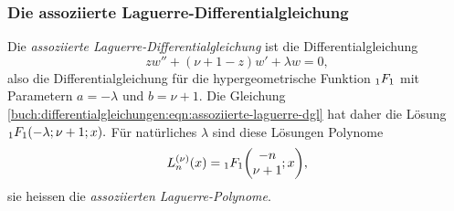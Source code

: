\subsubsection{Die assoziierte Laguerre-Differentialgleichung}
%
%
%
Die {\em assoziierte Laguerre-Differentialgleichung} ist die
Differentialgleichung
\begin{equation}
zw'' + (\nu  +1-z)w' + \lambda w = 0,
\label{buch:differentialgleichungen:eqn:assoziierte-laguerre-dgl}
\end{equation}
also die Differentialgleichung für die hypergeometrische Funktion
$\mathstrut_1F_1$ mit Parametern $a=-\lambda$ und $b=\nu+1$.
Die Gleichung
\eqref{buch:differentialgleichungen:eqn:assoziierte-laguerre-dgl}
hat daher die Lösung
\(
\mathstrut_1F_1(-\lambda;\nu+1;x).
\)
Für natürliches $\lambda$ sind diese Lösungen Polynome
\[
L_n^{(\nu)}(x)
=
\mathstrut_1F_1\biggl(
\begin{matrix}-n\\\nu+1\end{matrix}
;x\biggr),
\]
sie heissen die {\em assoziierten Laguerre-Polynome}.
%
%
